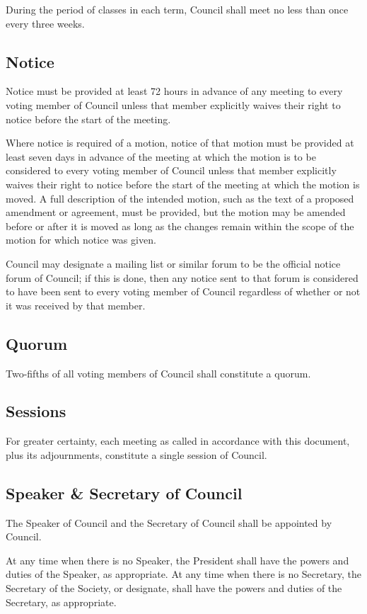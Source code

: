 During the period of classes in each term, Council shall meet no less
than once every three weeks.

\subsection{Notice}
Notice must be provided at least 72 hours in advance of any meeting to every
voting member of Council unless that member explicitly waives their
right to notice before the start of the meeting.

Where notice is required of a motion, notice of that motion must be provided at
least seven days in advance of the meeting at which the motion is to be
considered to every voting member of Council unless that member
explicitly waives their right to notice before the start of the meeting at
which the motion is moved. A full description of the intended motion, such as
the text of a proposed amendment or agreement, must be provided, but the motion
may be amended before or after it is moved as long as the changes remain within
the scope of the motion for which notice was given.

Council may designate a mailing list or similar forum to be the
official notice forum of Council; if this is done, then any notice
sent to that forum is considered to have been sent to every voting member of
Council regardless of whether or not it was received by that member.

\subsection{Quorum}
Two-fifths of all voting members of Council shall constitute a
quorum.

\subsection{Sessions}
For greater certainty, each meeting as called in accordance with this document,
plus its adjournments, constitute a single session of Council.

\subsection{Speaker \& Secretary of Council}
The Speaker of Council and the Secretary of Council shall
be appointed by Council. 

At any time when there is no Speaker, the President shall have the powers and
duties of the Speaker, as appropriate.  At any time when there is no Secretary,
the Secretary of the Society, or designate, shall have the powers and duties of the
Secretary, as appropriate.


